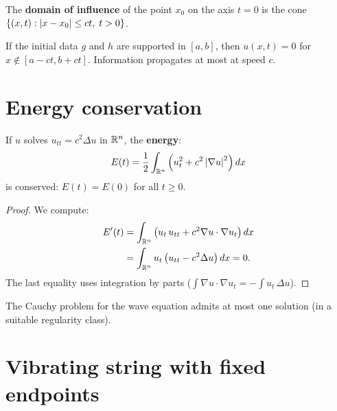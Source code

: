 \begin{definition}
The \textbf{domain of influence} of the point $x_0$ on the axis $t = 0$ is
the cone $\{(x,t) : \left| x - x_0 \right| \leq ct,\; t > 0\}$.
\end{definition}

\begin{theorem}
If the initial data $g$ and $h$ are supported in $[a,b]$, then
$u(x,t) = 0$ for $x \notin [a-ct, b+ct]$. Information propagates at
most at speed $c$.
\end{theorem}

\section{Energy conservation}

\begin{theorem}
If $u$ solves $u_{tt} = c^2\Delta u$ in $\mathbb{R}^n$, the \textbf{energy}:
\begin{equation}\label{eq:wave_energy}
    E(t) = \frac{1}{2}\int_{\mathbb{R}^n}
    \left(u_t^2 + c^2\left| \nabla u \right|^2\right) dx
\end{equation}
is conserved: $E(t) = E(0)$ for all $t \geq 0$.
\end{theorem}

\begin{proof}
We compute:
\begin{align*}
    E'(t) &= \int_{\mathbb{R}^n} \left(u_t\, u_{tt} + c^2 \nabla u \cdot \nabla u_t\right) dx \\
    &= \int_{\mathbb{R}^n} u_t \left(u_{tt} - c^2\Delta u\right) dx = 0.
\end{align*}
The last equality uses integration by parts
($\int \nabla u \cdot \nabla u_t = -\int u_t\, \Delta u$).
\end{proof}

\begin{corollary}[Uniqueness]
The Cauchy problem for the wave equation admits at most one solution
(in a suitable regularity class).
\end{corollary}

\section{Vibrating string with fixed endpoints}

